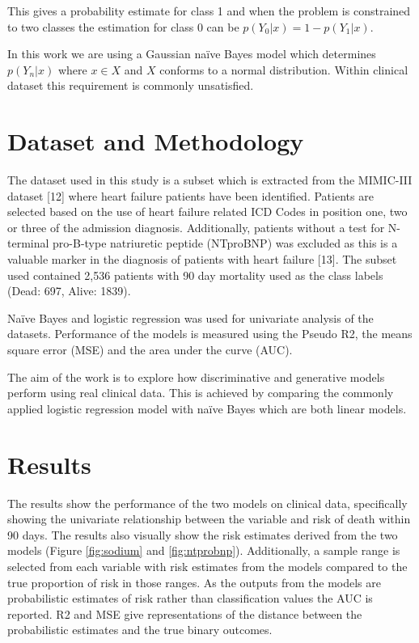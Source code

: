 \documentclass[a4paper,UKenglish]{oasics-v2016}
\begin{document}
This gives a probability estimate for class 1 and when the problem is constrained to two classes the estimation for class 0 can be $p(Y_0|x) = 1 - p(Y_1|x)$.

In this work we are using a Gaussian naïve Bayes model which determines $p(Y_n|x)$ where $x \in X$ and $X$ conforms to a normal distribution. Within clinical dataset this requirement is commonly unsatisfied.  

\section{Dataset and Methodology}
The dataset used in this study is a subset which is extracted from the MIMIC-III dataset [12] where heart failure patients have been identified. Patients are selected based on the use of heart failure related ICD Codes in position one, two or three of the admission diagnosis. Additionally, patients without a test for N-terminal pro-B-type natriuretic peptide (NTproBNP) was excluded as this is a valuable marker in the diagnosis of patients with heart failure [13]. The subset used contained 2,536 patients with 90 day mortality used as the class labels (Dead: 697, Alive: 1839).

Naïve Bayes and logistic regression was used for univariate analysis of the datasets. Performance of the models is measured using the Pseudo R2, the means square error (MSE) and the area under the curve (AUC).

The aim of the work is to explore how discriminative and generative models perform using real clinical data. This is achieved by comparing the commonly applied logistic regression model with naïve Bayes which are both linear models.


\section{Results}



The results show the performance of the two models on clinical data, specifically showing the univariate relationship between the variable and risk of death within 90 days. The results also visually show the risk estimates derived from the two models (Figure \ref{fig:sodium} and \ref{fig:ntprobnp}).  Additionally, a sample range is selected from each variable with risk estimates from the models compared to the true proportion of risk in those ranges. As the outputs from the models are probabilistic estimates of risk rather than classification values the AUC is reported. R2 and MSE give representations of the distance between the probabilistic estimates and the true binary outcomes.
\end{document}
